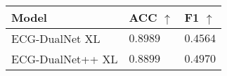 \begin{tabular}{>{\raggedright\arraybackslash}p{}>{\raggedright\arraybackslash}p{}>{\raggedright\arraybackslash}p{}}
    \hline
	Model & ACC $\uparrow$ & F1 $\uparrow$ \\
	\hline
	ECG-DualNet XL & $0.8989$ & $0.4564$ \\
	ECG-DualNet++ XL & $0.8899$ & $0.4970$ \\
	\hline
\end{tabular}
